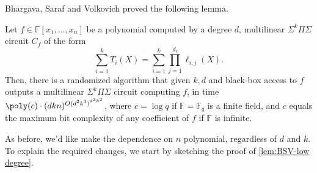 \documentclass[12pt]{article}
\newcommand{\F}{\mathbb{F}}
\newcommand{\Fn}{\F[x_1,\ldots,x_n]}
\newcommand{\Sps}[1]{\Sigma^{#1} \Pi\Sigma}
\begin{document}
	Bhargava, Saraf and Volkovich proved the following lemma.
	
	\begin{lemma}
		\label{lem:BSV-low degree}
		Let $f \in \Fn$ be a polynomial computed by a degree $d$, multilinear $\Sps{k}$ circuit $C_f$ of the form 
		\begin{equation*}
			\sum\limits_{i = 1}^k T_i(X)= \sum_{i= 1}^k
			\prod_{j=1}^{d_i}\ell_{i,j}(X).
		\end{equation*} 
		Then, there is a randomized algorithm that given $k,d$ and black-box access to $f$ outputs a multilinear $\Sps{k}$ circuit computing $f$, in time $\poly(c) \cdot (dkn)^{{O(d^2k^3)}^{d^2k^2}}$, 	where $c=\log q$ if $\F=\F_q$ is a finite field, and $c$ equals the maximum bit complexity of any coefficient of $f$ if $\F$ is infinite.
	\end{lemma}
	
	As before, we'd like make the dependence on $n$ polynomial, regardless of $d$ and $k$. To explain the required changes, we start by sketching the proof of \autoref{lem:BSV-low degree}.
	
\end{document}
